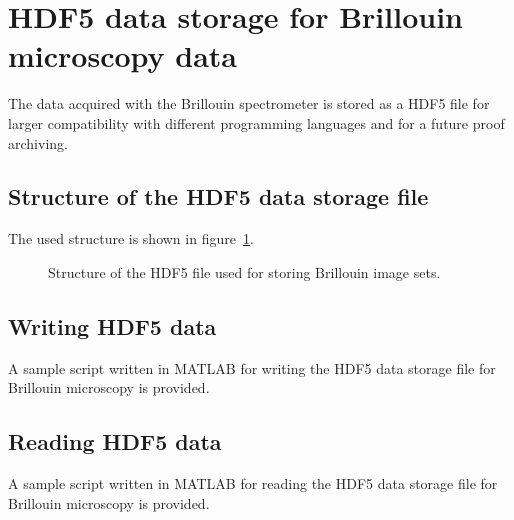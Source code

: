 \documentclass[a4paper,12pt,titlepage,BCOR7mm, bibliography=totoc, parskip=half,numbers=noenddot]{scrartcl}
\begin{document}

\section*{HDF5 data storage for Brillouin microscopy data}

The data acquired with the Brillouin spectrometer is stored as a HDF5 file for larger compatibility with different programming languages and for a future proof archiving.

\subsection*{Structure of the HDF5 data storage file}

The used structure is shown in figure~\ref{fig:hdf5structure}.

\begin{figure}[h!]
	\centering
	
	\caption{Structure of the HDF5 file used for storing Brillouin image sets.}
	\label{fig:hdf5structure}
\end{figure}

\subsection*{Writing HDF5 data}

A sample script written in MATLAB for writing the HDF5 data storage file for Brillouin microscopy is provided.

\subsection*{Reading HDF5 data}

A sample script written in MATLAB for reading the HDF5 data storage file for Brillouin microscopy is provided.
\end{document}

